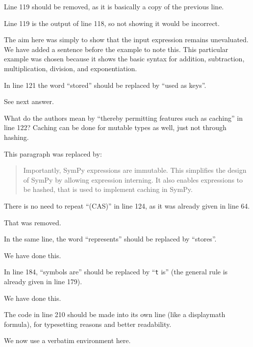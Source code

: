 \documentclass[answers,12pt]{exam}
\begin{document}
\begin{questions}
\question Line 119 should be removed, as it is basically a copy of the previous line.
\begin{solution}
Line 119 is the output of line 118, so not showing it would
be incorrect.

The aim here was simply to show that the input expression remains unevaluated.
We have added a sentence before the example to note this.
This particular example was chosen because it shows the basic syntax for
addition, subtraction, multiplication, division, and exponentiation.
\end{solution}

\question In line 121 the word ``stored'' should be replaced by ``used as keys''.
\begin{solution}
See next answer.
\end{solution}

\question What do the authors mean by ``thereby permitting features such as caching'' in line 122? Caching can be done for mutable types as well, just not through hashing.
\begin{solution}
This paragraph was replaced by:
\begin{quote}
Importantly, SymPy expressions are immutable. This simplifies the design of
SymPy by allowing expression interning. It also enables expressions to be
hashed, that is used to implement caching in SymPy.
\end{quote}
\end{solution}

\question There is no need to repeat ``(CAS)'' in line 124, as it was already given in line 64.
\begin{solution}
That was removed.
\end{solution}

\question In the same line, the word ``represents'' should be replaced by ``stores''.
\begin{solution}
We have done this.
\end{solution}

\question In line 184, ``symbols are'' should be replaced by ``\texttt{t} is'' (the general rule is already given in line 179).
\begin{solution}
We have done this.
\end{solution}

\question The code in line 210 should be made into its own line (like a displaymath formula), for typesetting reasons and better readability.
\begin{solution}
We now use a verbatim environment here.
\end{solution}


\end{questions}
\end{document}
